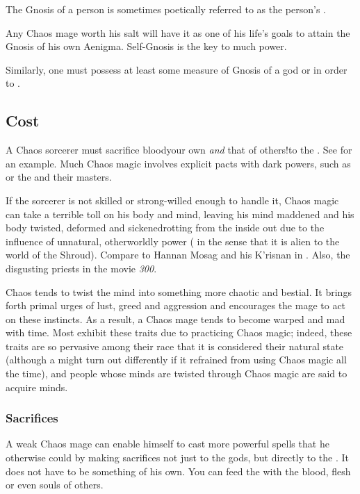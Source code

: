 The Gnosis of a person is sometimes poetically referred to as the person's . 

Any Chaos mage worth his salt will have it as one of his life's goals to attain the Gnosis of his own Aenigma. 
Self-Gnosis is the key to much power. 

Similarly, one must possess at least some measure of Gnosis of a god or  in order to . 






\subsection{Cost}
A Chaos sorcerer must sacrifice blood\dash your own \emph{and} that of others!\dash to the . See  for an example. Much Chaos magic involves explicit pacts with dark powers, such as  or the  and their masters.

If the sorcerer is not skilled or strong-willed enough to handle it, Chaos magic can take a terrible toll on his body and mind, leaving his mind maddened and his body twisted, deformed and sickened\dash rotting from the inside out due to the influence of unnatural, otherworldly power ( in the sense that it is alien to the world of the Shroud). Compare to Hannan Mosag and his K'risnan in \cite{StevenEriksonIanCameronEsslemont:MalazanBookoftheFallen}. Also, the disgusting priests in the movie \emph{300}.

Chaos tends to twist the mind into something more chaotic and bestial. It brings forth primal urges of lust, greed and aggression and encourages the mage to act on these instincts. As a result, a Chaos mage tends to become warped and mad with time. Most \dragons{} exhibit these traits due to practicing Chaos magic; indeed, these traits are so pervasive among their race that it is considered their natural state (although a \dragon{} might turn out differently if it refrained from using Chaos magic all the time), and people whose minds are twisted through Chaos magic are said to acquire \draconic{} minds. 





\subsubsection{Sacrifices}
A weak Chaos mage can enable himself to cast more powerful spells that he otherwise could by making sacrifices not just to the gods, but directly to the . 
It does not have to be something of his own. 
You can feed the \daemons{} with the blood, flesh or even souls of others. 

